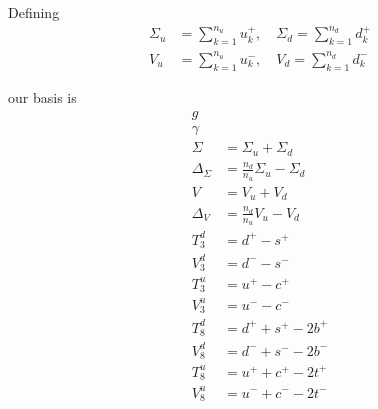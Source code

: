 \documentclass[a4paper,twoside]{article}
\title{}
\author{}
\date{}
\begin{document}
Defining
\begin{align*}
\Sigma_u&=\sum_{k=1}^{n_u}u_k^+,  \quad \Sigma_d=\sum_{k=1}^{n_d}d_k^+ \\
V_u&=\sum_{k=1}^{n_u}u_k^-, \quad V_d=\sum_{k=1}^{n_d}d_k^-
\end{align*}

our basis is
\begin{align*}
g & \\
\gamma & \\
\Sigma &= \Sigma_u + \Sigma_d \\
\Delta_\Sigma & = \frac{n_d}{n_u}\Sigma_u - \Sigma_d \\
V & = V_u + V_d \\
\Delta_V & = \frac{n_d}{n_u}V_u - V_d \\
T_3^d &=d^+ - s^+ \\
V_3^d &=d^- - s^- \\
T_3^u &=u^+ - c^+ \\
V_3^u &=u^- - c^- \\
T_8^d &=d^+ + s^+ - 2b^+ \\
V_8^d &=d^- + s^- - 2b^- \\
T_8^u &=u^+ + c^+ - 2t^+ \\
V_8^u &=u^- + c^- - 2t^-
\end{align*}
\end{document}

